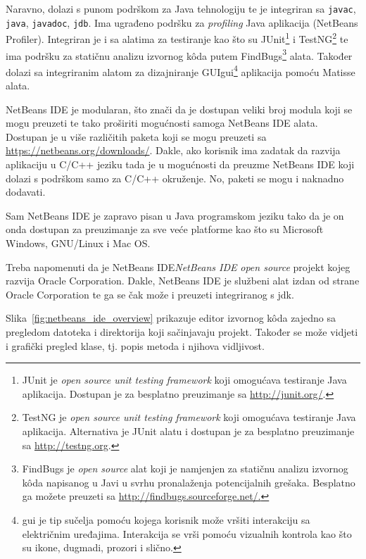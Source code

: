 Naravno, dolazi s punom podrškom za Java tehnologiju te je integriran sa \texttt{javac}, \texttt{java}, \texttt{javadoc}, \texttt{jdb}. Ima ugrađeno podršku za \emph{profiling} Java aplikacija (NetBeans Profiler). Integriran je i sa alatima za testiranje kao što su JUnit\footnote{JUnit je \emph{open source unit testing framework} koji omogućava testiranje Java aplikacija. Dostupan je za besplatno preuzimanje sa \url{http://junit.org/}.} i TestNG\footnote{TestNG je \emph{open source unit testing framework} koji omogućava testiranje Java aplikacija. Alternativa je JUnit alatu i dostupan je za besplatno preuzimanje sa \url{http://testng.org}.} te ima podršku za statičnu analizu izvornog kôda putem FindBugs\footnote{FindBugs je \emph{open source} alat koji je namjenjen za statičnu analizu izvornog kôda napisanog u Javi u svrhu pronalaženja potencijalnih grešaka. Besplatno ga možete preuzeti sa \url{http://findbugs.sourceforge.net/.}} alata. Također dolazi sa integriranim alatom za dizajniranje GUI\gls{gui}\footnote{\gls{gui} je tip sučelja pomoću kojega korisnik može vršiti interakciju sa električnim uređajima. Interakcija se vrši pomoću vizualnih kontrola kao što su ikone, dugmadi, prozori i slično.} aplikacija pomoću Matisse alata.

NetBeans IDE je modularan, što znači da je dostupan veliki broj modula koji se mogu preuzeti te tako proširiti mogućnosti samoga NetBeans IDE alata. Dostupan je u više različitih paketa koji se mogu preuzeti sa \url{https://netbeans.org/downloads/}. Dakle, ako korisnik ima zadatak da razvija aplikaciju u C/C++ jeziku tada je u mogućnosti da preuzme NetBeans IDE koji dolazi s podrškom samo za C/C++ okruženje. No, paketi se mogu i naknadno dodavati.

Sam NetBeans IDE je zapravo pisan u Java programskom jeziku tako da je on onda dostupan za preuzimanje za sve veće platforme kao što su Microsoft Windows, GNU/Linux i Mac OS.

Treba napomenuti da je NetBeans IDE\emph{NetBeans IDE} \emph{open source} projekt kojeg razvija Oracle Corporation. Dakle, NetBeans IDE je službeni alat izdan od strane Oracle Corporation te ga se čak može i preuzeti integriranog s \gls{jdk}.

Slika~\ref{fig:netbeans_ide_overview} prikazuje editor izvornog kôda zajedno sa pregledom datoteka i direktorija koji sačinjavaju projekt. Također se može vidjeti i grafički pregled klase, tj. popis metoda i njihova vidljivost.

